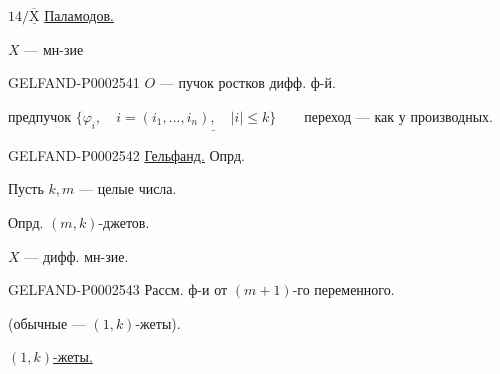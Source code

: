 $14/\underline{\overline{\mathrm{X}}}$ \underline{Паламодов.}

$X$ — мн-зие

\begin{GelfandAdjacentEvidence}{GELFAND-P000254}{1}
$O$ — пучок ростков дифф. ф-й.





\end{GelfandAdjacentEvidence}


предпучок $\underline{\{\varphi_i,\quad i=(i_1,\ldots,i_n),\quad |i|\le k\}\qquad\text{переход}}$ — как у производных.





\begin{GelfandAdjacentEvidence}{GELFAND-P000254}{2}
\underline{Гельфанд.} Опрд.

Пусть $k,m$ — целые числа.





Опрд. $(m,k)$-джетов.

\end{GelfandAdjacentEvidence}


$X$ — дифф. мн-зие.

\begin{GelfandAdjacentEvidence}{GELFAND-P000254}{3}
Рассм. ф-и от $(m+1)$-го переменного.

\end{GelfandAdjacentEvidence}


(обычные — $(1,k)$-жеты).

\underline{$(1,k)$-жеты.}

